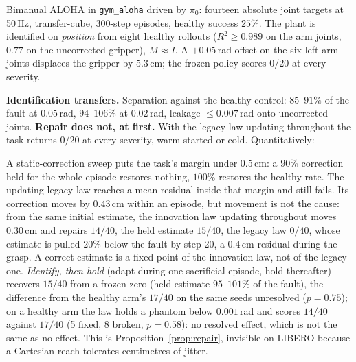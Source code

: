 \documentclass{article}
\newcommand{\code}[1]{\texttt{\small #1}}
\begin{document}
Bimanual ALOHA in \code{gym\_aloha} driven by $\pi_0$: fourteen absolute joint targets at
50\,Hz, transfer-cube, 300-step episodes, healthy success $25\%$. The plant is identified on
\emph{position} from eight healthy rollouts ($R^2\ge0.989$ on the arm joints, $0.77$ on the uncorrected gripper),
$M\approx I$. A $+0.05$\,rad offset on the six left-arm joints displaces the gripper by
$5.3$\,cm; the frozen policy scores $0/20$ at every severity.

\textbf{Identification transfers.} Separation against the healthy control: $85$--$91\%$ of
the fault at $0.05$\,rad, $94$--$106\%$ at $0.02$\,rad, leakage $\le0.007$\,rad onto
uncorrected joints. \textbf{Repair does not, at first.} With the legacy law updating throughout the task
returns $0/20$ at every severity, warm-started or cold. Quantitatively:

\begin{center}\small
{}
\end{center}

A static-correction sweep puts the task's margin under $0.5$\,cm: a $90\%$ correction held
for the whole episode restores nothing, $100\%$ restores the healthy rate. The updating legacy law
reaches a mean residual inside that margin and still fails. Its correction moves by $0.43$\,cm
within an episode, but movement is not the cause: from the same initial estimate, the innovation
law updating throughout moves $0.30$\,cm and repairs $14/40$, the held estimate $15/40$, the
legacy law $0/40$, whose estimate is pulled $20\%$ below the fault by step 20, a $0.4$\,cm
residual during the grasp. A correct estimate is a fixed point of the innovation law, not of
the legacy one. \emph{Identify, then hold} (adapt during one sacrificial episode, hold thereafter)
recovers $15/40$ from a frozen zero (held estimate $95$--$101\%$ of the fault),
the difference from the healthy arm's $17/40$ on the same seeds unresolved ($p=0.75$); on a
healthy arm the law holds a phantom below $0.001$\,rad and scores $14/40$ against $17/40$
(5 fixed, 8 broken, $p=0.58$): no resolved effect, which is not the same as no effect. This is
Proposition~\ref{prop:repair}, invisible on LIBERO because a Cartesian reach tolerates
centimetres of jitter.
\end{document}
